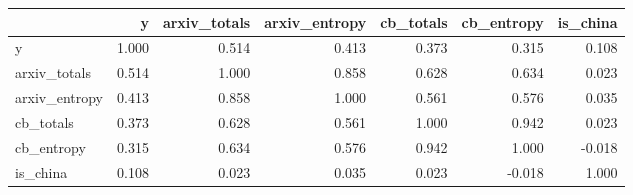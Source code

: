 \begin{tabular}{lrrrrrr}
\toprule
{} &      y &  arxiv\_totals &  arxiv\_entropy &  cb\_totals &  cb\_entropy &  is\_china \\
\midrule
y             &  1.000 &         0.514 &          0.413 &      0.373 &       0.315 &     0.108 \\
arxiv\_totals  &  0.514 &         1.000 &          0.858 &      0.628 &       0.634 &     0.023 \\
arxiv\_entropy &  0.413 &         0.858 &          1.000 &      0.561 &       0.576 &     0.035 \\
cb\_totals     &  0.373 &         0.628 &          0.561 &      1.000 &       0.942 &     0.023 \\
cb\_entropy    &  0.315 &         0.634 &          0.576 &      0.942 &       1.000 &    -0.018 \\
is\_china      &  0.108 &         0.023 &          0.035 &      0.023 &      -0.018 &     1.000 \\
\bottomrule
\end{tabular}
